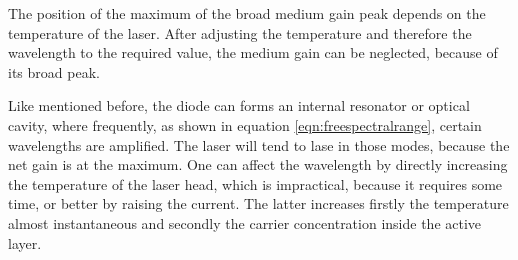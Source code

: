 The position of the maximum of the broad medium gain peak depends on the temperature of the laser.
After adjusting the temperature and therefore the wavelength to the required value, the medium gain can be neglected, because
of its broad peak.

Like mentioned before, the diode can forms an internal resonator or optical cavity, where frequently, as shown in equation
\eqref{eqn:freespectralrange}, certain wavelengths are amplified. The laser will tend to lase in those modes,
because the net gain is at the maximum. One can affect the wavelength by directly increasing the temperature of the
laser head, which is impractical, because it requires some time, or better by raising the current. The latter
increases firstly the temperature almost instantaneous and secondly the carrier concentration inside the active layer.














